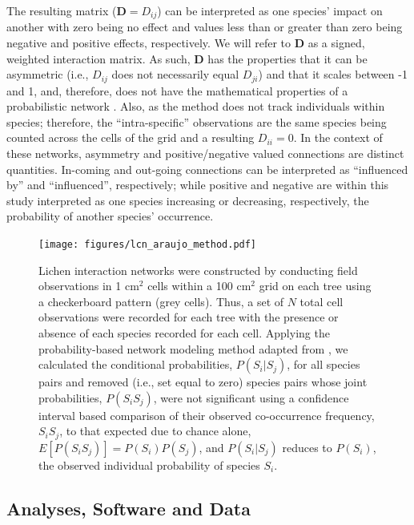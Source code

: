 \documentclass[fleqn,12pt]{olplainarticle}
\begin{document}
The resulting matrix ($\mathbf{D} = D_{ij}$) can be interpreted as one
species' impact on another with zero being no effect and values less
than or greater than zero being negative and positive effects,
respectively. We will refer to $\mathbf{D}$ as a signed, weighted
interaction matrix. As such, $\mathbf{D}$ has the properties that it
can be asymmetric (i.e., $D_{ij}$ does not necessarily equal $D_{ji}$)
and that it scales between -1 and 1, and, therefore, does not have the
mathematical properties of a probabilistic network
\citep{Poisot2016TheNetworks}. Also, as the method does not track
individuals within species; therefore, the ``intra-specific''
observations are the same species being counted across the cells of
the grid and a resulting $D_{ii} = 0$. In the context of these
networks, asymmetry and positive/negative valued connections are
distinct quantities. In-coming and out-going connections can be
interpreted as ``influenced by'' and ``influenced'', respectively;
while positive and negative are within this study interpreted as one
species increasing or decreasing, respectively, the probability of
another species' occurrence.

\begin{figure}[ht]
\centering
\texttt{[image: figures/lcn\_araujo\_method.pdf]}
\caption{Lichen interaction networks were constructed by conducting
  field observations in 1 cm$^2$ cells within a 100 cm$^2$ grid on each
  tree using a checkerboard pattern (grey cells). Thus, a set of $N$
  total cell observations were recorded for each tree with the
  presence or absence of each species recorded for each cell. Applying
  the probability-based network modeling method adapted from
  \citep{Araujo2011}, we calculated the conditional probabilities,
  $P(S_i|S_j)$, for all species pairs and removed (i.e., set equal to
  zero) species pairs whose joint probabilities, $P(S_i S_j)$, were
  not significant using a confidence interval based comparison of
  their observed co-occurrence frequency, $S_iS_j$, to that expected
  due to chance alone, $E[P(S_iS_j)] = P(S_i) P(S_j)$, and
  $P(S_i|S_j)$ reduces to $P(S_i)$, the observed individual
  probability of species $S_i$.}
\label{fig:conet_method}
\end{figure}


\subsection*{Analyses, Software and Data}
\end{document}
